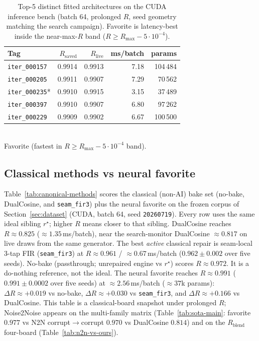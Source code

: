 \begin{table}[t]
  \centering
  \caption{Top-5 distinct fitted architectures on the CUDA inference bench (batch 64, prolonged $R$, seed geometry matching the search campaign). Favorite is latency-best inside the near-max-$R$ band ($R\ge R_{\max}-5\cdot10^{-4}$).}
  \label{tab:top5}
  \setlength{\tabcolsep}{3pt}
  \begin{tabular}{@{}lrrrr@{}}
    \toprule
    Tag & $R_{\mathrm{saved}}$ & $R_{\mathrm{live}}$ & ms/batch & params \\
    \midrule
    \texttt{iter\_000157} & 0.9914 & 0.9913 & 7.18 & 104\,484 \\
    \texttt{iter\_000205} & 0.9911 & 0.9907 & 7.29 & 70\,562 \\
    \texttt{iter\_000235}* & 0.9910 & 0.9915 & 3.15 & 37\,489 \\
    \texttt{iter\_000397} & 0.9910 & 0.9907 & 6.80 & 97\,262 \\
    \texttt{iter\_000229} & 0.9909 & 0.9902 & 6.67 & 100\,500 \\
    \bottomrule
  \end{tabular}\\[0.4em]
  {\footnotesize *Favorite (fastest in $R\ge R_{\max}-5\cdot10^{-4}$ band).}
\end{table}

\subsection{Classical methods vs neural favorite}
\label{sec:classical-vs-favorite}
Table~\ref{tab:canonical-methods} scores the classical (non-AI) bake set (no-bake, DualCosine, and \texttt{seam\_fir3}) plus the neural favorite on the frozen corpus of Section~\ref{sec:dataset} (CUDA, batch 64, seed \texttt{20260719}).
Every row uses the same ideal sibling $r^{\star}$; higher $R$ means closer to that sibling.
DualCosine reaches $R\approx 0.825$ ($\approx 1.35$\,ms/batch), near the search-monitor DualCosine $\approx 0.817$ on live draws from the same generator.
The best \emph{active} classical repair is seam-local 3-tap FIR (\texttt{seam\_fir3}) at $R\approx 0.961$ / $\approx 0.67$\,ms/batch ($0.962\pm0.002$ over five seeds).
No-bake (passthrough; unrepaired engine vs $r^{\star}$) scores $R\approx 0.972$.
It is a do-nothing reference, not the ideal.
The neural favorite reaches $R\approx 0.991$ ($0.991\pm0.0002$ over five seeds) at $\approx 2.56$\,ms/batch ($\approx 37$k params):
$\Delta R \approx {+}0.019$ vs no-bake, $\Delta R \approx {+}0.030$ vs \texttt{seam\_fir3}, and $\Delta R \approx {+}0.166$ vs DualCosine.
This table is a classical-board snapshot under prolonged $R$; Noise2Noise appears on the multi-family matrix
(Table~\ref{tab:sota-main}: favorite $0.977$ vs N2N corrupt$\to$corrupt $0.970$ vs DualCosine $0.814$)
and on the $R_{\mathrm{blend}}$ four-board (Table~\ref{tab:n2n-vs-ours}).

